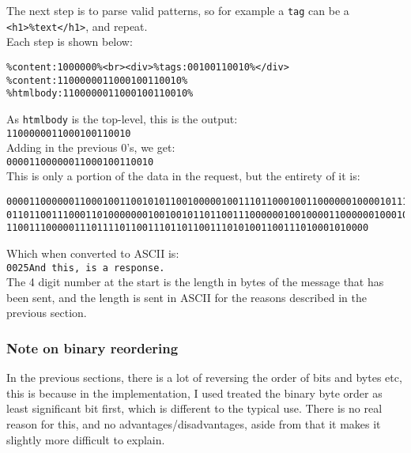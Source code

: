 The next step is to parse valid patterns, so for example a \texttt{tag} can be a \texttt{<h1>\%text</h1>}, and repeat.\\
Each step is shown below:
\begin{lstlisting}[numbers=none]
%content:1000000%<br><div><span>%tags:00110010%</span></div>
%content:1000000%<br><div>%tags:00100110010%</div>
%content:1100000011000100110010%
%htmlbody:1100000011000100110010%
\end{lstlisting}
As \texttt{htmlbody} is the top-level, this is the output:\\
\texttt{1100000011000100110010}\\
Adding in the previous 0's, we get:\\
\texttt{00001100000011000100110010}\\
This is only a portion of the data in the request, but the entirety of it is:
\begin{lstlisting}[numbers=none,breaklines=true,breakatwhitespace=false]
000011000000110001001100101011001000001001110110001001100000010000101110000101101001
011011001110001101000000010010010110110011100000010010000110000001000100111010100110
1100111000001110111101100111011011001110101001100111010001010000
\end{lstlisting}
Which when converted to ASCII is:\\
\texttt{0025And this, is a response.}\\
The 4 digit number at the start is the length in bytes of the message that has been sent, and the length is sent in ASCII for the reasons described in the previous section.

\subsubsection{Note on binary reordering}
In the previous sections, there is a lot of reversing the order of bits and bytes etc, this is because in the implementation, I used treated the binary byte order as least significant bit first, which is different to the typical use. There is no real reason for this, and no advantages/disadvantages, aside from that it makes it slightly more difficult to explain.
